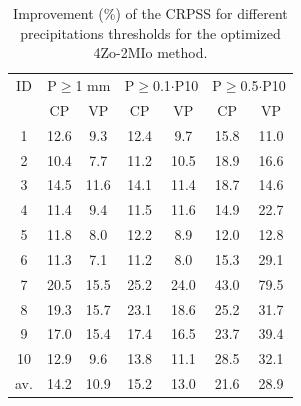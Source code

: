 \documentclass[review]{elsarticle}
\begin{document}
\begin{table}[t]
	\caption{Improvement (\%) of the CRPSS for different precipitations thresholds for the optimized 4Zo-2MIo method.}
	\footnotesize
	\begin{center}
		\begin{tabular}{ccccccc}
			\hline 
			ID & \multicolumn{2}{c}{P\(\geq\)1 mm} & \multicolumn{2}{c}{P\(\geq\)0.1\(\cdot\)P10} & \multicolumn{2}{c}{P\(\geq\)0.5\(\cdot\)P10} \\  
			& CP & VP & CP & VP & CP & VP \\ 
			\hline 
			1 & 12.6 & 9.3 & 12.4 & 9.7 & 15.8 & 11.0 \\
			2 & 10.4 & 7.7 & 11.2 & 10.5 & 18.9 & 16.6 \\ 
			3 & 14.5 & 11.6 & 14.1 & 11.4 & 18.7 & 14.6 \\ 
			4 & 11.4 & 9.4 & 11.5 & 11.6 & 14.9 & 22.7 \\ 
			5 & 11.8 & 8.0 & 12.2 & 8.9 & 12.0 & 12.8 \\ 
			6 & 11.3 & 7.1 & 11.2 & 8.0 & 15.3 & 29.1 \\ 
			7 & 20.5 & 15.5 & 25.2 & 24.0 & 43.0 & 79.5 \\
			8 & 19.3 & 15.7 & 23.1 & 18.6 & 25.2 & 31.7 \\ 
			9 & 17.0 & 15.4 & 17.4 & 16.5 & 23.7 & 39.4 \\ 
			10 & 12.9 & 9.6 & 13.8 & 11.1 & 28.5 & 32.1 \\ 
			\hline 
			av. & 14.2 & 10.9 & 15.2 & 13.0 & 21.6 & 28.9 \\ 
			\hline 
		\end{tabular} 
	\end{center}
	\label{table:scores_thresholds_4Zo-2MIo}
\end{table}
\end{document}
